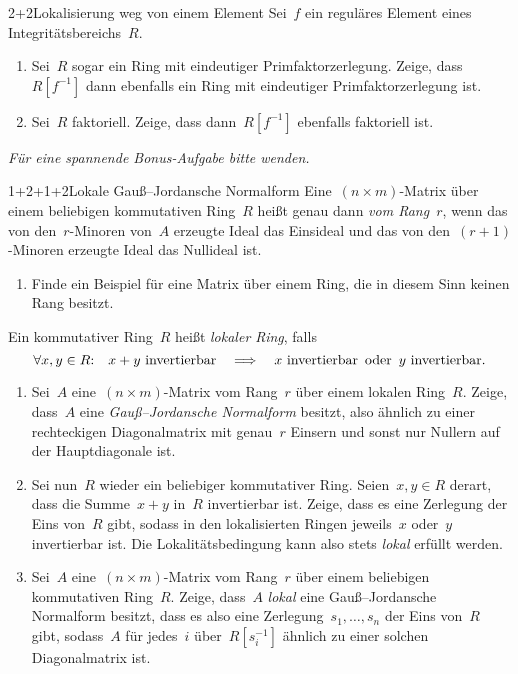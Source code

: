 \documentclass{algblatt}
\begin{document}
\begin{aufgabe}{2+2}{Lokalisierung weg von einem Element}
Sei~$f$ ein reguläres Element eines Integritätsbereichs~$R$.
\begin{enumerate}
\item Sei~$R$ sogar ein Ring mit eindeutiger Primfaktorzerlegung. Zeige,
dass~$R[f^{-1}]$ dann ebenfalls ein Ring mit eindeutiger Primfaktorzerlegung
ist.
\item Sei~$R$ faktoriell. Zeige, dass dann~$R[f^{-1}]$ ebenfalls faktoriell
ist.
\end{enumerate}
\end{aufgabe}

\begin{center}
\emph{Für eine spannende Bonus-Aufgabe bitte wenden.}
\end{center}
\newpage

\begin{aufgabe}{1+2+1+2}{Lokale Gauß--Jordansche Normalform}
Eine~$(n \times m)$-Matrix über einem beliebigen kommutativen Ring~$R$
heißt genau dann \emph{vom Rang~$r$}, wenn das von den~$r$-Minoren von~$A$
erzeugte Ideal das Einsideal und das von den~$(r+1)$-Minoren erzeugte Ideal das
Nullideal ist.
\begin{enumerate}
\item Finde ein Beispiel für eine Matrix über einem Ring, die in diesem Sinn
keinen Rang besitzt.
\end{enumerate}
Ein kommutativer Ring~$R$ heißt \emph{lokaler Ring}, falls
\[ \forall x,y \in R{:}\quad \text{$x + y$ invertierbar}
\quad\Longrightarrow\quad
\text{$x$ invertierbar \,oder\, $y$ invertierbar}. \]
\begin{enumerate}
\addtocounter{enumi}{1}
\item Sei~$A$ eine~$(n \times m)$-Matrix vom Rang~$r$ über einem lokalen Ring~$R$.
Zeige, dass~$A$ eine \emph{Gauß--Jordansche Normalform} besitzt,
also ähnlich zu einer rechteckigen Diagonalmatrix
mit genau~$r$ Einsern und sonst nur Nullern auf der Hauptdiagonale ist.
\item Sei nun~$R$ wieder ein beliebiger kommutativer Ring. Seien~$x,y \in R$ derart, dass die
Summe~$x+y$ in~$R$ invertierbar ist. Zeige, dass es eine Zerlegung der Eins
von~$R$ gibt, sodass in den lokalisierten Ringen jeweils~$x$ oder~$y$
invertierbar ist. Die Lokalitätsbedingung kann also stets \emph{lokal} erfüllt
werden.
\item Sei~$A$ eine~$(n \times m)$-Matrix vom Rang~$r$ über einem beliebigen
kommutativen Ring~$R$. Zeige, dass~$A$ \emph{lokal} eine
Gauß--Jordansche Normalform besitzt, dass es also eine
Zerlegung~$s_1,\ldots,s_n$ der Eins von~$R$ gibt, sodass~$A$ für jedes~$i$
über~$R[s_i^{-1}]$ ähnlich zu einer solchen Diagonalmatrix ist.
\end{enumerate}
\end{aufgabe}
\end{document}
